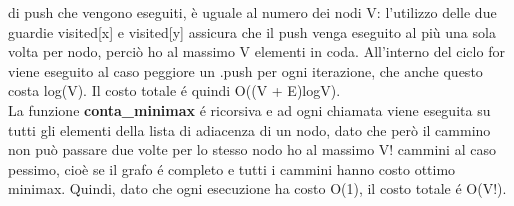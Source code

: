 \documentclass {article}
\begin{document}
di push che vengono eseguiti, è uguale al numero dei nodi V: 
l'utilizzo delle due guardie visited[x] e visited[y] assicura che 
il push venga eseguito al più una sola volta per nodo, perciò ho 
al massimo V elementi in coda. All'interno del ciclo for viene eseguito
al caso peggiore un .push per ogni iterazione, che anche questo costa log(V).
Il costo totale é quindi O((V + E)logV).
\\La funzione \textbf{conta\_minimax} é ricorsiva e ad ogni chiamata
viene eseguita su tutti gli elementi della lista di adiacenza di un
nodo, dato che però il cammino non può passare due volte per lo
stesso nodo ho al massimo V! cammini al caso pessimo, cioè
se il grafo é completo e tutti i cammini hanno costo ottimo minimax.
Quindi, dato che ogni esecuzione ha costo O(1), il costo totale
é O(V!).  
\end{document}
